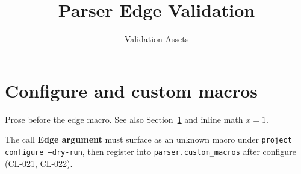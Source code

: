 \documentclass[11pt]{article}
\title{Parser Edge Validation}
\author{Validation Assets}
\date{}
\newcommand{\edgemacro}[1]{\textbf{#1}}
\begin{document}
\maketitle

\section{Configure and custom macros}
\label{sec:edge}

Prose before the edge macro. %
See also Section~\ref{sec:edge} and inline math $x = 1$.

The call \edgemacro{Edge argument} must surface as an unknown macro under
\texttt{project configure --dry-run}, then register into
\texttt{parser.custom\_macros} after configure (CL-021, CL-022).
\end{document}
